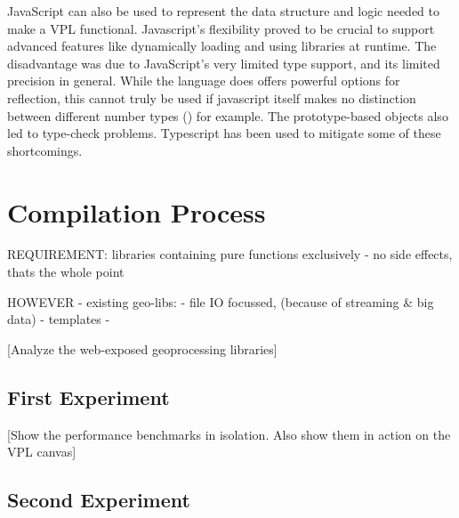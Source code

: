 JavaScript can also be used to represent the data structure and logic needed to make a VPL functional. 
Javascript's flexibility proved to be crucial to support advanced features like dynamically loading and using libraries at runtime. 
The disadvantage was due to JavaScript's very limited type support, and its limited precision in general. 
While the language does offers powerful options for reflection, this cannot truly be used if javascript itself makes no distinction between different number types () for example. 
The prototype-based objects also led to type-check problems. 
Typescript has been used to mitigate some of these shortcomings.  



\section{Compilation Process}
\label{sec:analyses:compilation}

REQUIREMENT: libraries containing pure functions exclusively
- no side effects, thats the whole point


HOWEVER 
- existing geo-libs: 
  - file IO focussed, (because of streaming \& big data)
  - templates
  - 




[Analyze the web-exposed geoprocessing libraries]

\subsection{First Experiment}

[Show the performance benchmarks in isolation. Also show them in action on the VPL canvas]

\subsection{Second Experiment}

